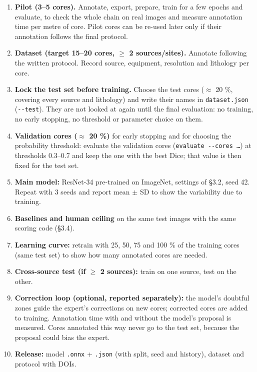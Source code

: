 \documentclass[
  10pt,
]{article}
\providecommand{\tightlist}{%
  \setlength{\itemsep}{0pt}\setlength{\parskip}{0pt}}
\begin{document}
\begin{enumerate}
\def\labelenumi{\arabic{enumi}.}
\tightlist
\item
  \textbf{Pilot (3--5 cores).} Annotate, export, prepare, train for a
  few epochs and evaluate, to check the whole chain on real images and
  measure annotation time per metre of core. Pilot cores can be re-used
  later only if their annotation follows the final protocol.
\item
  \textbf{Dataset (target 15--20 cores, $\geq$ 2 sources/sites).} Annotate
  following the written protocol. Record source, equipment, resolution
  and lithology per core.
\item
  \textbf{Lock the test set before training.} Choose the test cores ($\approx$
  20 \%, covering every source and lithology) and write their names in
  \texttt{dataset.json} (\texttt{-\/-test}). They are not looked at
  again until the final evaluation: no training, no early stopping, no
  threshold or parameter choice on them.
\item
  \textbf{Validation cores ($\approx$ 20 \%)} for early stopping and for
  choosing the probability threshold: evaluate the validation cores
  (\texttt{evaluate\ -\/-cores\ …}) at thresholds 0.3--0.7 and keep the
  one with the best Dice; that value is then fixed for the test set.
\item
  \textbf{Main model:} ResNet-34 pre-trained on ImageNet, settings of
  §3.2, seed 42. Repeat with 3 seeds and report mean $\pm$ SD to show the
  variability due to training.
\item
  \textbf{Baselines and human ceiling} on the same test images with the
  same scoring code (§3.4).
\item
  \textbf{Learning curve:} retrain with 25, 50, 75 and 100 \% of the
  training cores (same test set) to show how many annotated cores are
  needed.
\item
  \textbf{Cross-source test (if $\geq$ 2 sources):} train on one source, test
  on the other.
\item
  \textbf{Correction loop (optional, reported separately):} the model's
  doubtful zones guide the expert's corrections on new cores; corrected
  cores are added to training. Annotation time with and without the
  model's proposal is measured. Cores annotated this way never go to the
  test set, because the proposal could bias the expert.
\item
  \textbf{Release:} model \texttt{.onnx} + \texttt{.json} (with split,
  seed and history), dataset and protocol with DOIs.
\end{enumerate}
\end{document}
